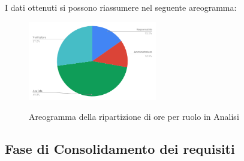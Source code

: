 I dati ottenuti si possono riassumere nel seguente areogramma:
\begin{figure}[H] 
			\centering 
				\includegraphics[width=0.5\textwidth]{res/images/areogramma_analisi.png}\\
				\caption{Areogramma della ripartizione di ore per ruolo in Analisi}
			\label{AreogrammaAnalisi}
\end{figure}

\subsection{Fase di Consolidamento dei requisiti}
